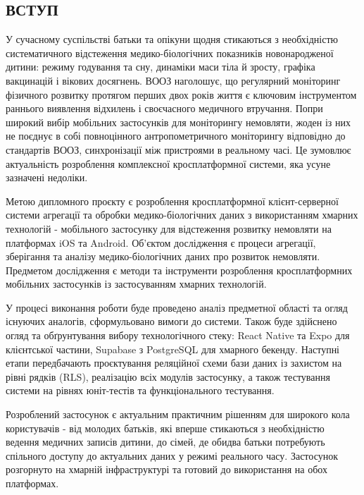
\begin{unnumbered}

\section{ВСТУП}

У сучасному суспільстві батьки та опікуни щодня стикаються з необхідністю систематичного відстеження медико-біологічних показників новонародженої дитини: режиму годування та сну, динаміки маси тіла й зросту, графіка вакцинацій і вікових досягнень. \gls{ВООЗ} наголошує, що регулярний моніторинг фізичного розвитку протягом перших двох років життя є ключовим інструментом раннього виявлення відхилень і своєчасного медичного втручання. Попри широкий вибір мобільних застосунків для моніторингу немовляти, жоден із них не поєднує в собі повноцінного антропометричного моніторингу відповідно до стандартів \gls{ВООЗ}, синхронізації між пристроями в реальному часі. Це зумовлює актуальність розроблення комплексної кросплатформної системи, яка усуне зазначені недоліки.

Метою дипломного проєкту є розроблення кросплатформної клієнт-серверної системи агрегації та обробки медико-біологічних даних з використанням хмарних технологій - мобільного застосунку для відстеження розвитку немовляти на платформах iOS та Android. Об'єктом дослідження є процеси агрегації, зберігання та аналізу медико-біологічних даних про розвиток немовляти. Предметом дослідження є методи та інструменти розроблення кросплатформних мобільних застосунків із застосуванням хмарних технологій.

У процесі виконання роботи буде проведено аналіз предметної області та огляд існуючих аналогів, сформульовано вимоги до системи. Також буде здійснено огляд та обґрунтування вибору технологічного стеку: React Native та Expo для клієнтської частини, Supabase з PostgreSQL для хмарного бекенду. Наступні етапи передбачають проєктування реляційної схеми бази даних із захистом на рівні рядків (\gls{RLS}), реалізацію всіх модулів застосунку, а також тестування системи на рівнях юніт-тестів та функціонального тестування.

Розроблений застосунок є актуальним практичним рішенням для широкого кола користувачів - від молодих батьків, які вперше стикаються з необхідністю ведення медичних записів дитини, до сімей, де обидва батьки потребують спільного доступу до актуальних даних у режимі реального часу. Застосунок розгорнуто на хмарній інфраструктурі та готовий до використання на обох платформах.

\end{unnumbered}
